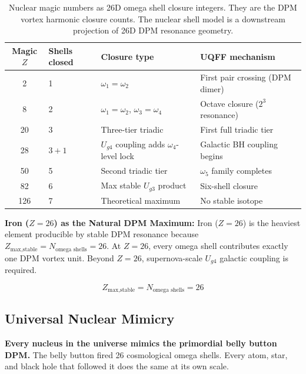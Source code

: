 \documentclass[12pt,a4paper]{article}
\begin{document}
\begin{table}[H]
\centering
\begin{tabular}{@{}clll@{}}
\toprule
\textbf{Magic $Z$} & \textbf{Shells closed} & \textbf{Closure type} & \textbf{UQFF mechanism} \\
\midrule
2   & 1 & $\omega_1 = \omega_2$ & First pair crossing (DPM dimer) \\
8   & 2 & $\omega_1{=}\omega_2$, $\omega_3{=}\omega_4$ & Octave closure ($2^3$ resonance) \\
20  & 3 & Three-tier triadic & First full triadic tier \\
28  & $3+1$ & $U_{g4}$ coupling adds $\omega_4$-level lock & Galactic BH coupling begins \\
50  & 5 & Second triadic tier & $\omega_5$ family completes \\
82  & 6 & Max stable $U_{g3}$ product & Six-shell closure \\
126 & 7 & Theoretical maximum & No stable isotope \\
\bottomrule
\end{tabular}
\caption{Nuclear magic numbers as 26D omega shell closure integers.  They are the
DPM vortex harmonic closure counts.  The nuclear shell model is a downstream
projection of 26D DPM resonance geometry.}
\label{tab:magic_numbers}
\end{table}

\noindent\textbf{Iron ($Z=26$) as the Natural DPM Maximum:}
Iron ($Z=26$) is the heaviest element producible by stable DPM resonance because
$Z_{\text{max,stable}} = N_{\text{omega shells}} = 26$.
At $Z=26$, every omega shell contributes exactly one DPM vortex unit.
Beyond $Z=26$, supernova-scale $U_{g4}$ galactic coupling is required.

\begin{equation}
  Z_{\text{max,stable}} = N_{\text{omega shells}} = 26
  \label{eq:z_max}
\end{equation}

\subsection{Universal Nuclear Mimicry}

\textbf{Every nucleus in the universe mimics the primordial belly button DPM.}
The belly button fired 26 cosmological omega shells.  Every atom, star, and black
hole that followed it does the same at its own scale.
\end{document}
